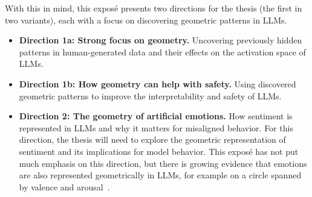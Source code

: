 \documentclass[11pt,a4paper]{article}
\begin{document}
With this in mind, this exposé presents two directions for the thesis (the first in two variants), each with a focus on discovering geometric patterns in LLMs.
\begin{itemize}
  \item \textbf{Direction 1a: Strong focus on geometry.} Uncovering previously hidden patterns in human-generated data and their effects on the activation space of LLMs.
  \item \textbf{Direction 1b: How geometry can help with safety.} Using discovered geometric patterns to improve the interpretability and safety of LLMs.
  \item \textbf{Direction 2: The geometry of artificial emotions.} How sentiment is represented in LLMs and why it matters for misaligned behavior. For this direction, the thesis will need to explore the geometric representation of sentiment and its implications for model behavior. This exposé has not put much emphasis on this direction, but there is growing evidence that emotions are also represented geometrically in LLMs, for example on a circle spanned by valence and arousal~\cite{sun2026valence,bigelow2026stories}.
\end{itemize}

\printbibliography[heading=bibintoc,title={References}]
\end{document}
